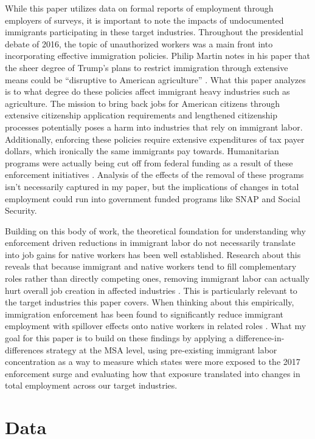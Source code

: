 \documentclass[12pt]{article}
\begin{document}
While this paper utilizes data on formal reports of employment through employers of surveys, it is important to note the impacts of undocumented immigrants participating in these target industries. Throughout the presidential debate of 2016, the topic of unauthorized workers was a main front into incorporating effective immigration policies. Philip Martin notes in his paper that the sheer degree of Trump's plans to restrict immigration through extensive means could be ``disruptive to American agriculture'' \citep[p.~1]{martin2017}. What this paper analyzes is to what degree do these policies affect immigrant heavy industries such as agriculture. The mission to bring back jobs for American citizens through extensive citizenship application requirements and lengthened citizenship processes potentially poses a harm into industries that rely on immigrant labor. Additionally, enforcing these policies require extensive expenditures of tax payer dollars, which ironically the same immigrants pay towards. Humanitarian programs were actually being cut off from federal funding as a result of these enforcement initiatives \citep[p.~6]{pierce2018}. Analysis of the effects of the removal of these programs isn't necessarily captured in my paper, but the implications of changes in total employment could run into government funded programs like SNAP and Social Security.

Building on this body of work, the theoretical foundation for understanding why enforcement driven reductions in immigrant labor do not necessarily translate into job gains for native workers has been well established. Research about this reveals that because immigrant and native workers tend to fill complementary roles rather than directly competing ones, removing immigrant labor can actually hurt overall job creation in affected industries \citep{chassamboulli2015}. This is particularly relevant to the target industries this paper covers. When thinking about this empirically, immigration enforcement has been found to significantly reduce immigrant employment with spillover effects onto native workers in related roles \citep{east2023}. What my goal for this paper is to build on these findings by applying a difference-in-differences strategy at the MSA level, using pre-existing immigrant labor concentration as a way to measure which states were more exposed to the 2017 enforcement surge and evaluating how that exposure translated into changes in total employment across our target industries.

 
\section{Data}
 
\end{document}
